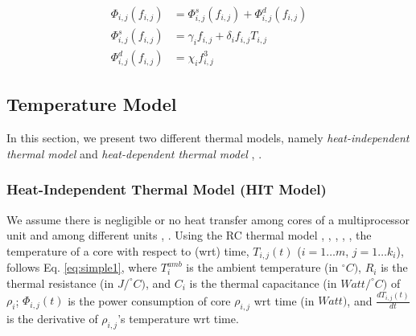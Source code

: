 \documentclass[conference]{IEEEtran}
\begin{document}
\vspace{-0.2in}

\begin{subequations}\label{eq:power}
	\begin{align}
		\Phi_{i,j}(f_{i,j}) &= \Phi^{s}_{i,j}(f_{i,j}) + \Phi^{d}_{i,j}(f_{i,j}) \label{eq:tpower} \\
		\Phi^{s}_{i,j}(f_{i,j}) &= \gamma_i f_{i,j} + \delta_i f_{i,j} T_{i,j} \label{eq:static}\\
		\Phi^{d}_{i,j}(f_{i,j}) &=  \chi_i  f_{i,j}^3 \label{eq:dynamic}
	\end{align}
\end{subequations}


\subsection{Temperature Model}

In this section, we present two different thermal models, %
namely \emph{heat-independent thermal model} \cite{Quan10} and \emph{heat-dependent thermal model} \cite{Chantem10}, \cite{Fisher09}.  



\subsubsection{Heat-Independent Thermal Model (HIT Model)}

\label{sec:simple}

We assume there is negligible or no heat transfer among cores of a multiprocessor unit and among different units \cite{Quan10}, \cite{Chaturvedi10}. 
Using the RC thermal model 
\cite{Chen09}, \cite{Chantem10}, \cite{Quan10},  \cite{Fisher09}, \cite{Chaturvedi10}, %
the temperature of a core %
with respect to (wrt) time, %
$T_{i,j}(t)$ ($i=1\ldots m$, $j=1\ldots k_i$), %
follows
Eq. \ref{eq:simple1}, where $T_i^{amb}$ is the ambient temperature (in $^\circ C)$, 
$R_i$ is the thermal resistance (in $J/ ^\circ C)$, and $C_i$ is the thermal capacitance (in $Watt/ ^\circ C)$ of $\rho_i$; $\Phi_{i,j}(t)$ is the power consumption of core $\rho_{i,j}$  wrt time (in $Watt)$,
and $\frac{dT_{i,j}(t)}{dt}$ is the derivative of $\rho_{i,j}$'s  temperature wrt time. 


\vspace{-0.1in}
\end{document}
